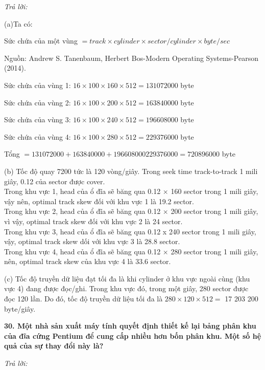 \documentclass{report}
\begin{document}
\bigskip
\textit{Trả lời:}

\smallskip
(a)Ta có:\centerline{Sức chứa của một vùng $ = track \times cylinder \times sector/cylinder \times byte/sec$}

\changefontsizes{11pt}
\centerline{Nguồn: Andrew S. Tanenbaum, Herbert Bos-Modern Operating Systems-Pearson (2014).}
\changefontsizes{13pt}



\setlength{\parindent}{1cm}
Sức chứa của vùng 1: $16 \times 100 \times 160 \times 512 = 131 072 000$ byte

Sức chứa của vùng 2: $16 \times 100 \times 200 \times 512 = 163 840 000$ byte

Sức chứa của vùng 3: $16 \times 100 \times 240 \times 512 = 196 608 000$ byte

Sức chứa của vùng 4: $16 \times 100 \times 280 \times 512 = 229 376 000$ byte

Tổng $= 131 072 000 + 163 840 000 + 196 608 000 229 376 000 = 720 896 000$ byte

\smallskip
\setlength{\parindent}{0cm}
(b) Tốc độ quay 7200 tức là 120 vòng/giây. Trong seek time track-to-track 1 mili giây, 0.12 của sector được cover.\\ Trong khu vực 1, head của ổ đĩa sẽ băng qua 0.12 $\times$ 160 sector trong 1 mili giây, vậy nên, optimal track skew đối với khu vực 1 là 19.2 sector.\\ Trong khu vực 2, head của ổ đĩa sẽ băng qua 0.12 $\times$ 200 sector trong 1 mili giây, vì vậy, optimal track skew đối với khu vực 2 là 24 sector.\\ Trong khu vực 3, head của ổ đĩa sẽ băng qua 0.12 x 240 sector trong 1 mili giây, vậy, optimal track skew dối với khu vực 3 là 28.8 sector.\\ Trong khu vực 4, head của ổ đĩa sẽ băng qua 0.12 $\times$ 280 sector trong 1 mili giây, nên, optimal track skew của khu vực 4 là 33.6 sector.

\smallskip
(c) Tốc độ truyền dữ liệu đạt tối đa là khi cylinder ở khu vực ngoài cùng (khu vực 4) đang được đọc/ghi. Trong khu vực đó, trong một giây, 280 sector được đọc 120 lần. Do đó, tốc độ truyền dữ liệu tối đa là $280 \times 120 \times 512 =$ 17 203 200 byte/giây.


\bigskip
\textbf{30. Một nhà sản xuất máy tính quyết định thiết kế lại bảng phân khu của đĩa cứng Pentium để cung cấp nhiều hơn bốn phân khu. Một số hệ quả của sự thay đổi này là?}

\bigskip
\textit{Trả lời:}
\end{document}
